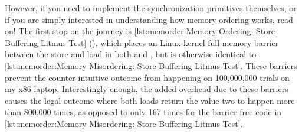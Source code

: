 However, if you need to implement the synchronization primitives
themselves, or if you are simply interested in understanding how memory
ordering works, read on!
The first stop on the journey is
\cref{lst:memorder:Memory Ordering: Store-Buffering Litmus Test}
(),
which places an  Linux-kernel full memory barrier between
the store and load in both  and , but is otherwise
identical to
\cref{lst:memorder:Memory Misordering: Store-Buffering Litmus Test}.
These barriers prevent the counter-intuitive outcome from happening
on 100,000,000 trials on my x86 laptop.
Interestingly enough, the added overhead due to these barriers causes the
legal outcome where both loads return the value two to happen more
than 800,000 times, as opposed to only 167 times for the
barrier-free code in
\cref{lst:memorder:Memory Misordering: Store-Buffering Litmus Test}.

\begin{table}
\renewcommand*{\arraystretch}{1.1}
\small
\centering\OneColumnHSpace{-0.1in}
\caption{Memory Ordering: Store-Buffering Sequence of Events}
\label{tab:memorder:Memory Ordering: Store-Buffering Sequence of Events}
\end{table}

